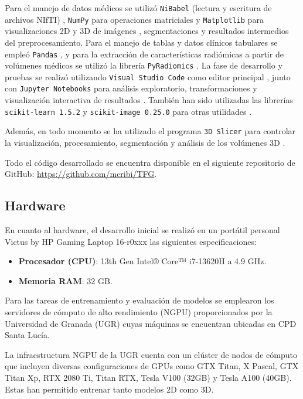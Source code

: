 Para el manejo de datos médicos se utilizó \texttt{NiBabel} (lectura y escritura de archivos NIfTI) \parencite{nibabel}, \texttt{NumPy} para operaciones matriciales \parencite{harris2020array} y \texttt{Matplotlib} para visualizaciones 2D y 3D de imágenes \parencite{Hunter:2007}, segmentaciones y resultados intermedios del preprocesamiento. Para el manejo de tablas y datos clínicos tabulares se empleó \texttt{Pandas} \parencite{mckinney-proc-scipy-2010}, y para la extracción de características radiómicas a partir de volúmenes médicos se utilizó la librería \texttt{PyRadiomics} \parencite{van2017computational}. La fase de desarrollo y pruebas se realizó utilizando \texttt{Visual Studio Code} como editor principal \parencite{vscode}, junto con \texttt{Jupyter Notebooks} para análisis exploratorio, transformaciones y visualización interactiva de resultados \parencite{jupyter}. También han sido utilizadas las librerías \texttt{scikit-learn 1.5.2} \parencite{scikit-learn} y \texttt{scikit-image 0.25.0} para otras utilidades \parencite{van2014scikit}.

Además, en todo momento se ha utilizado el programa \texttt{3D Slicer} para controlar la visualización, procesamiento, segmentación y análisis de los volúmenes 3D \parencite{pieper20043d}. 

Todo el código desarrollado se encuentra disponible en el siguiente repositorio de GitHub: \url{https://github.com/mcribi/TFG}.

\subsection{Hardware}

En cuanto al hardware, el desarrollo inicial se realizó en un portátil personal Victus by HP Gaming Laptop 16-r0xxx las siguientes especificaciones: 

\begin{itemize}
    \item \textbf{Procesador (CPU)}: 13th Gen Intel® Core™ i7-13620H a 4.9 GHz.
    \item \textbf{Memoria RAM}: 32 GB.
\end{itemize}

Para las tareas de entrenamiento y evaluación de modelos se emplearon los servidores de cómputo de alto rendimiento (NGPU) proporcionados por la Universidad de Granada (UGR) cuyas máquinas se encuentran ubicadas en CPD Santa Lucía. 

La infraestructura NGPU de la UGR cuenta con un clúster de nodos de cómputo que incluyen diversas configuraciones de GPUs como GTX Titan, X Pascal, GTX Titan Xp, RTX 2080 Ti, Titan RTX, Tesla V100 (32GB) y Tesla A100 (40GB). Estas han permitido entrenar tanto modelos 2D como 3D.


